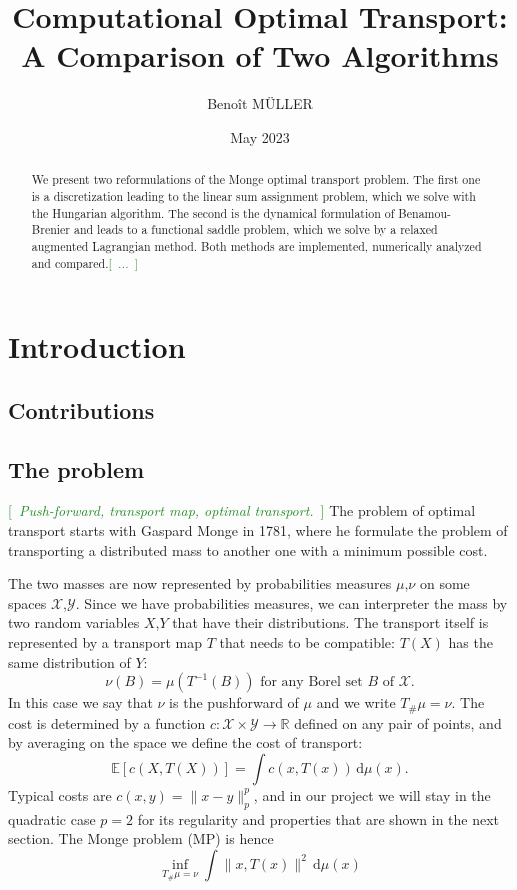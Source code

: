 \documentclass[a4paper]{article}
\title{ \Huge Computational Optimal Transport:\\ A Comparison of Two Algorithms}
\author{Benoît MÜLLER}
\date{May 2023}
\theoremstyle{definition}
\theoremstyle{remark}
\newcommand{\dd}{\,\mathrm{d}}
\newcommand{\R}{\mathbb{R}}
\newcommand{\E}{\mathbb{E}}
\newcommand{\X}{\mathcal{X}}
\newcommand{\Y}{\mathcal{Y}}
\newcommand{\com}[1]{\textcolor{ForestGreen}{[~\emph{#1}~]}}
\begin{document}
\maketitle
\tableofcontents
\begin{abstract}
We present two reformulations of the Monge optimal transport problem. The first one is a discretization leading to the linear sum assignment problem, which we solve with the Hungarian algorithm. The second is the dynamical formulation of Benamou-Brenier and leads to a functional saddle problem, which we solve by a relaxed augmented Lagrangian method. Both methods are implemented, numerically analyzed and compared.\com{...}
\end{abstract}
\section{Introduction}
\subsection{Contributions}
\subsection{The problem}  \com{Push-forward, transport map, optimal transport.}
The problem of optimal transport starts with Gaspard Monge in 1781, where he formulate the problem of transporting a distributed mass to another one with a minimum possible cost.

The two masses are now represented by probabilities measures $\mu$,$\nu$ on some spaces $\X$,$\Y$. Since we have probabilities measures, we can interpreter the mass by two random variables $X$,$Y$ that have their distributions. The transport itself is represented by a transport map $T$ that needs to be compatible: $T(X)$ has the same distribution of $Y$:
$$\nu(B) = \mu(T^{-1}(B)) \text{ for any Borel set } B \text{ of }\X.$$
In this case we say that $\nu$ is the pushforward of $\mu$ and we write $T_{\#}\mu = \nu$.
The cost is determined by a function $c:\X\times\Y\to\R$ defined on any pair of points, and by averaging on the space we define the cost of transport:
$$\E[c(X,T(X))] = \int c(x,T(x))\dd\mu(x).$$
Typical costs are $c(x,y)=\|x-y\|_p^p$, and in our project we will stay in the quadratic case $p=2$ for its regularity and properties that are shown in the next section.
The Monge problem (MP) is hence 
\[\inf_{T_{\#}\mu = \nu}\int \|x,T(x)\|^2\dd\mu(x) \label{eq:MP} \tag{MP} \]
\end{document}
